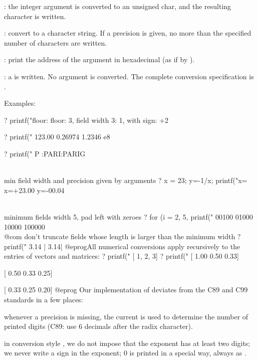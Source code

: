 {\item {}: the integer argument is converted to an unsigned char, and the
resulting character is written.

\item {}: convert to a character string. If a precision is given, no
more than the specified number of characters are written.

\item {}: print the address of the argument in hexadecimal (as if by
).

\item \kbd{\%}: a \kbd{\%} is written. No argument is converted. The complete
conversion specification is \kbd{\%\%}.

\noindent Examples:

\bprog
? printf("floor: %
floor: 3, field width 3:   1, with sign:  +2

? printf("%
123.00 0.26974 1.2346 e8

? printf("%
P :PARI:PARIG

\\ min field width and precision given by arguments
? x = 23; y=-1/x; printf("x=%
x=+23.00 y=-00.04

\\ minimum fields width 5, pad left with zeroes
? for (i = 2, 5, printf("%
00100
01000
10000
100000  \\@com don't truncate fields whose length is larger than the minimum width
? printf("%
3.14  |  3.14|
@eprog\noindent All numerical conversions apply recursively to the entries
of vectors and matrices:
\bprog
? printf("%
[   1,   2,   3]
? printf("%
[ 1.00  0.50  0.33]

[ 0.50  0.33  0.25]

[ 0.33  0.25  0.20]
@eprog
 Our implementation of 
deviates from the C89 and C99 standards in a few places:

\item whenever a precision is missing, the current  is
used to determine the number of printed digits (C89: use 6 decimals after
the radix character).

\item in conversion style , we do not impose that the
exponent has at least two digits; we never write a \kbd{+} sign in the
exponent; 0 is printed in a special way, always as .

}
